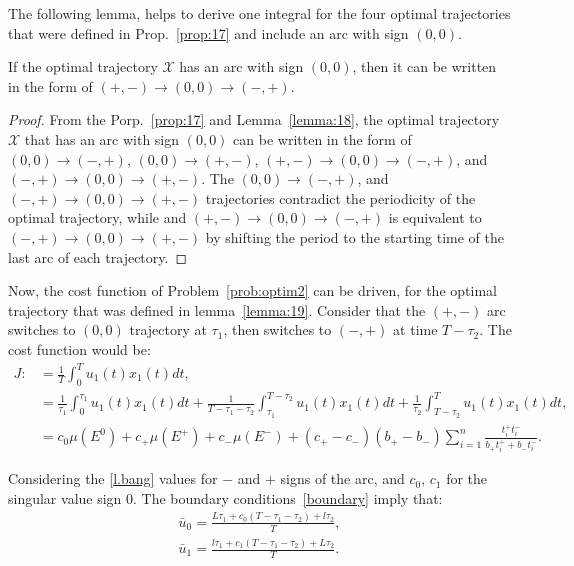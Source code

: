 The following lemma, helps to derive one integral for the four optimal trajectories that were defined in Prop.~\ref{prop:17} and include an arc with sign $(0,0)$.
%
\begin{lemma} \label{lemma:19}
	If the optimal trajectory $\mathscr X$ has an arc with sign $(0,0)$, then it can be written in the form of $(+,-)\to(0,0)\to(-,+)$.
\end{lemma}
%
\begin{proof}
	From the Porp.~\ref{prop:17} and Lemma~\ref{lemma:18}, the optimal trajectory $\mathscr X$ that has an arc with sign $(0,0)$ can be written in the form of $(0,0)\to(-,+)$, $(0,0)\to(+,-)$, $(+,-)\to(0,0)\to(-,+)$, and $(-,+)\to(0,0)\to(+,-)$.  
	The $(0,0)\to(-,+)$, and $(-,+)\to(0,0)\to(+,-)$ trajectories contradict the periodicity of the optimal trajectory, while and $(+,-)\to(0,0)\to(-,+)$ is equivalent to $(-,+)\to(0,0)\to(+,-)$ by shifting the period to the starting time of the last arc of each trajectory. 
\end{proof}

Now, the cost function of Problem~\ref{prob:optim2} can be driven, for the optimal trajectory that was defined in lemma~\ref{lemma:19}. 
Consider that the $(+,-)$ arc switches to $(0,0)$ trajectory at $\tau_1$, then switches to $(-,+)$ at time $T-\tau_2$. 
The cost function would be: 
%
\begin{subequations}
	\begin{align}
		J :&=  \frac{1}{T}\int_0^{T} u_1(t) x_1(t) dt, \\
		&= \frac{1}{\tau_1}\int_0^{\tau_1} u_1(t) x_1(t) dt + \frac{1}{T-\tau_1-\tau_2}\int_{\tau_1}^{T-\tau_2} u_1(t) x_1(t) dt + \frac{1}{\tau_2}\int_{T-\tau_2}^{T} u_1(t) x_1(t) dt, \\
		&= c_0 \mu(E^0)  +c_+ \mu(E^+)   +c_- \mu(E^-)
		+     (c_+ - c_-)  ( {b_+} - {b_-}  ) 
		\sum_{i=1}^n \frac{  t_i^+  t_i^-  }{ b_+ t_i ^+ + b_- t_i^- }.
	\end{align}
\end{subequations}

Considering the \eqref{l.bang} values for $-$ and $+$ signs of the arc, and $c_0$, $c_1$ for the singular value sign $0$. 
The boundary conditions~\eqref{boundary} imply that:
\begin{subequations}
	\begin{align}
		\bar u_0 = \frac{L \tau_1 + c_0 (T-\tau_1-\tau_2) + l \tau_2}{T}, \\
		\bar u_1 = \frac{l \tau_1 + c_1 (T-\tau_1-\tau_2) + L \tau_2}{T}.
	\end{align}
\end{subequations}

